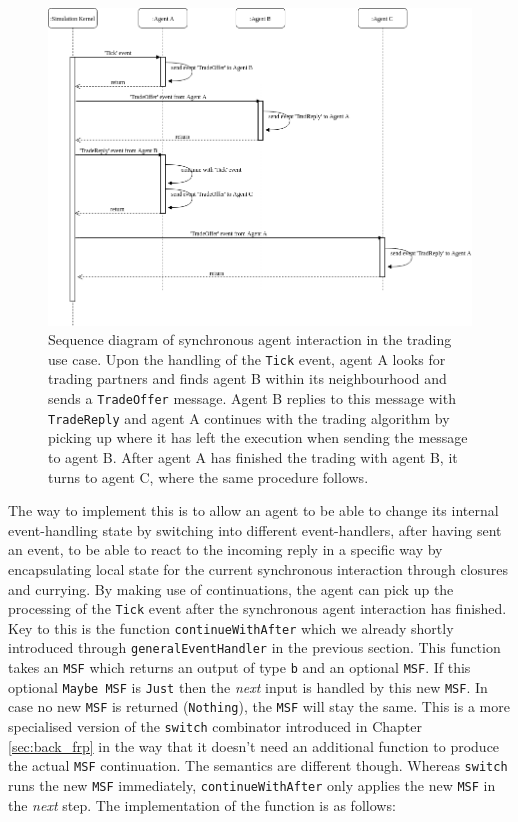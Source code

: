 \begin{figure}
	\centering
	\includegraphics[width=1.0\textwidth, angle=0]{./fig/eventdriven/syncagentinteractions.png}
	\caption{Sequence diagram of synchronous agent interaction in the trading use case. Upon the handling of the \texttt{Tick} event, agent A looks for trading partners and finds agent B within its neighbourhood and sends a \texttt{TradeOffer} message. Agent B replies to this message with \texttt{TradeReply} and agent A continues with the trading algorithm by picking up where it has left the execution when sending the message to agent B. After agent A has finished the trading with agent B, it turns to agent C, where the same procedure follows.}
	\label{fig:syncagentinteractions}
\end{figure}

The way to implement this is to allow an agent to be able to change its internal event-handling state by switching into different event-handlers, after having sent an event, to be able to react to the incoming reply in a specific way by encapsulating local state for the current synchronous interaction through closures and currying. By making use of continuations, the agent can pick up the processing of the \texttt{Tick} event after the synchronous agent interaction has finished. Key to this is the function \texttt{continueWithAfter} which we already shortly introduced through \texttt{generalEventHandler} in the previous section. This function takes an \texttt{MSF} which returns an output of type \texttt{b} and an optional \texttt{MSF}. If this optional \texttt{Maybe MSF} is \texttt{Just} then the \textit{next} input is handled by this new \texttt{MSF}. In case no new \texttt{MSF} is returned (\texttt{Nothing}), the \texttt{MSF} will stay the same. This is a more specialised version of the \texttt{switch} combinator introduced in Chapter \ref{sec:back_frp} in the way that it doesn't need an additional function to produce the actual \texttt{MSF} continuation. The semantics are different though. Whereas \texttt{switch} runs the new \texttt{MSF} immediately, \texttt{continueWithAfter} only applies the new \texttt{MSF} in the \textit{next} step. The implementation of the function is as follows:

